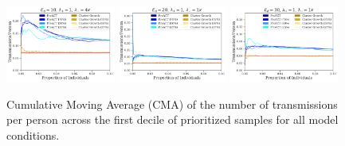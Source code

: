 \documentclass[a4paper,11pt]{article}
\begin{document}
\begin{figure}[!h]
\includegraphics[width=0.32\textwidth]{figs/results_efficacy_individual_SAMPLE-FIRSTART_STOPRATE-4x.pdf}
\includegraphics[width=0.32\textwidth]{figs/results_efficacy_individual_SAMPLE-FIRSTART_EXPDEGREE-20.pdf}
\includegraphics[width=0.32\textwidth]{figs/results_efficacy_individual_SAMPLE-FIRSTART_EXPDEGREE-30.pdf}\\
\caption{{Cumulative Moving Average (CMA) of the number of transmissions per person across the first decile of prioritized samples for all model conditions.}}\label{fig:cma-trans-individual-all}
\end{figure}

\clearpage
\end{document}
